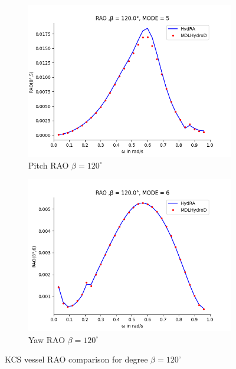 \begin{figure}[H]
\begin{subfigure}[b]{0.45\textwidth}
        \includegraphics[width=\textwidth]{plots/kcs/rao/rao5.png}
        \caption{Pitch RAO $\beta = 120^{\circ}$}
    \end{subfigure}
    \begin{subfigure}[b]{0.45\textwidth}
        \includegraphics[width=\textwidth]{plots/kcs/rao/rao6.png}
        \caption{Yaw RAO $\beta = 120^{\circ}$}
    \end{subfigure}
    \caption{KCS vessel RAO comparison for degree $\beta = 120^{\circ}$}
    \label{fig:kvlcc_rao_120}
\end{figure}
